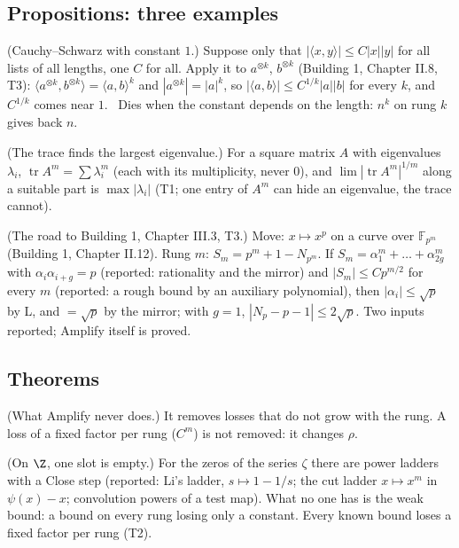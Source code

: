 \subsection*{Propositions: three examples}

\begin{lines}
\item[\lab{P1}] (Cauchy--Schwarz with constant $1$.) Suppose only that $|\langle x, y\rangle| \le C |x| |y|$ for all lists of all lengths, one $C$ for all. Apply it to $a^{\otimes k}$, $b^{\otimes k}$ (Building 1, Chapter II.8, T3): $\langle a^{\otimes k}, b^{\otimes k}\rangle = \langle a, b\rangle^k$ and $|a^{\otimes k}| = |a|^k$, so $|\langle a, b\rangle| \le C^{1/k} |a| |b|$ for every $k$, and $C^{1/k}$ comes near $1$. \ Dies when the constant depends on the length: $n^{k}$ on rung $k$ gives back $n$.
\item[\lab{P2}] (The trace finds the largest eigenvalue.) For a square matrix $A$ with eigenvalues $\lambda_i$, $\operatorname{tr} A^m = \sum \lambda_i^m$ (each with its multiplicity, never $0$), and $\lim |\operatorname{tr} A^m|^{1/m}$ along a suitable part is $\max |\lambda_i|$ (T1; one entry of $A^m$ can hide an eigenvalue, the trace cannot).
\item[\lab{P3}] (The road to Building 1, Chapter III.3, T3.) Move: $x \mapsto x^p$ on a curve over $\mathbb{F}_{p^m}$ (Building 1, Chapter II.12). Rung $m$: $S_m = p^m + 1 - N_{p^m}$. If $S_m = \alpha_1^m + \dots + \alpha_{2g}^m$ with $\alpha_i \alpha_{i+g} = p$ (reported: rationality and the mirror) and $|S_m| \le C p^{m/2}$ for every $m$ (reported: a rough bound by an auxiliary polynomial), then $|\alpha_i| \le \sqrt p$ by L, and $= \sqrt p$ by the mirror; with $g = 1$, $|N_p - p - 1| \le 2\sqrt p$. Two inputs reported; Amplify itself is proved.
\end{lines}

\subsection*{Theorems}

\begin{lines}
\item[\lab{T2}] (What Amplify never does.) It removes losses that do not grow with the rung. A loss of a fixed factor per rung ($C^m$) is not removed: it changes $\rho$.
\item[\lab{T3}] (On $\Z$, one slot is empty.) For the zeros of the series $\zeta$ there are power ladders with a Close step (reported: Li's ladder, $s \mapsto 1 - 1/s$; the cut ladder $x \mapsto x^m$ in $\psi(x) - x$; convolution powers of a test map). What no one has is the weak bound: a bound on every rung losing only a constant. Every known bound loses a fixed factor per rung (T2).
\end{lines}

